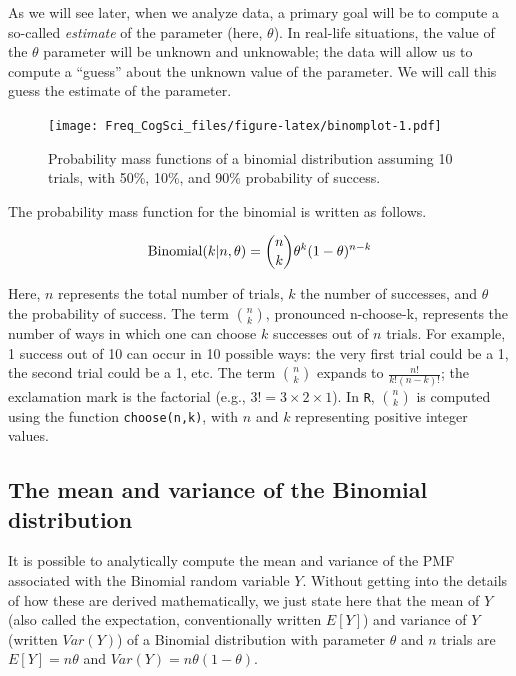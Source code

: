\documentclass[
  12pt,
]{krantz}
\theoremstyle{definition}
\theoremstyle{definition}
\theoremstyle{definition}
\theoremstyle{definition}
\theoremstyle{remark}
\begin{document}
As we will see later, when we analyze data, a primary goal will be to compute a so-called \emph{estimate} of the parameter (here, \(\theta\)). In real-life situations, the value of the \(\theta\) parameter will be unknown and unknowable; the data will allow us to compute a ``guess'' about the unknown value of the parameter. We will call this guess the estimate of the parameter.

\begin{figure}
\centering
\texttt{[image: Freq\_CogSci\_files/figure-latex/binomplot-1.pdf]}
\caption{\label{fig:binomplot}Probability mass functions of a binomial distribution assuming 10 trials, with 50\%, 10\%, and 90\% probability of success.}
\end{figure}

The probability mass function for the binomial is written as follows.

\begin{equation}
\hbox{Binomial}(k|n,\theta) = 
\binom{n}{k} \theta^{k} (1-\theta)^{n-k}
\end{equation}

Here, \(n\) represents the total number of trials, \(k\) the number of successes, and \(\theta\) the probability of success. The term \(\binom{n}{k}\), pronounced n-choose-k, represents the number of ways in which one can choose \(k\) successes out of \(n\) trials. For example, 1 success out of 10 can occur in 10 possible ways: the very first trial could be a 1, the second trial could be a 1, etc.
The term \(\binom{n}{k}\) expands to \(\frac{n!}{k!(n-k)!}\); the exclamation mark is the factorial (e.g., \(3!=3\times 2\times 1\)). In \texttt{R}, \(\binom{n}{k}\) is computed using the function \texttt{choose(n,k)}, with \(n\) and \(k\) representing positive integer values.

\hypertarget{the-mean-and-variance-of-the-binomial-distribution}{%
\subsection{The mean and variance of the Binomial distribution}\label{the-mean-and-variance-of-the-binomial-distribution}}

It is possible to analytically compute the mean and variance of the PMF associated with the Binomial random variable \(Y\). Without getting into the details of how these are derived mathematically, we just state here that the mean of \(Y\) (also called the expectation, conventionally written \(E[Y]\)) and variance of \(Y\) (written \(Var(Y)\)) of a Binomial distribution with parameter \(\theta\) and \(n\) trials are \(E[Y] = n\theta\) and \(Var(Y) = n\theta (1-\theta)\).
\end{document}
